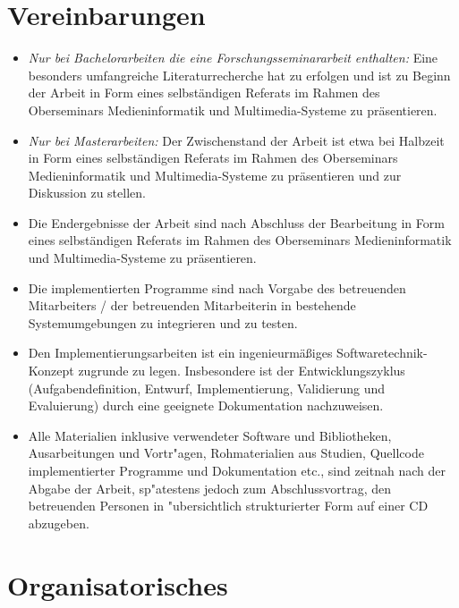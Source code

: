 \documentclass[a4paper, 11pt]{article}
\begin{document}

\section {Vereinbarungen}

\begin{itemize}
\item \emph{Nur bei Bachelorarbeiten die eine Forschungsseminararbeit enthalten:} Eine besonders umfangreiche Literaturrecherche hat zu erfolgen und ist zu Beginn der Arbeit in Form eines selbst\"{a}ndigen Referats im Rahmen des Oberseminars Medieninformatik und Multimedia-Systeme zu pr\"{a}sentieren.
\item \emph{Nur bei Masterarbeiten:} Der Zwischenstand der Arbeit ist etwa bei Halbzeit in Form eines selbst\"{a}ndigen Referats im Rahmen des Oberseminars Medieninformatik und Multimedia-Systeme zu pr\"{a}sentieren und zur Diskussion zu stellen.
\item Die Endergebnisse der Arbeit sind nach Abschluss der Bearbeitung in Form eines selbst\"{a}ndigen Referats im Rahmen des Oberseminars Medieninformatik und Multimedia-Systeme zu pr\"{a}sentieren. 
\item Die implementierten Programme sind nach Vorgabe des betreuenden Mitarbeiters / der betreuenden Mitarbeiterin in bestehende Systemumgebungen zu integrieren und zu testen.
\item Den Implementierungsarbeiten ist ein ingenieurm\"{a}{\ss}iges Softwaretechnik-Konzept zugrunde zu legen. Insbesondere ist der  Entwicklungszyklus (Aufgabendefinition, Entwurf, Implementierung,  Validierung und Evaluierung) durch eine geeignete Dokumentation nachzuweisen.
\item Alle Materialien inklusive verwendeter Software und Bibliotheken, Ausarbeitungen und Vortr"{a}gen, Rohmaterialien aus Studien, Quellcode implementierter Programme und Dokumentation etc., sind zeitnah nach der Abgabe der Arbeit, sp"{a}testens jedoch zum Abschlussvortrag, den betreuenden Personen in "{u}bersichtlich strukturierter  Form auf einer CD abzugeben.
\end{itemize}


\section {Organisatorisches}
\end{document}
